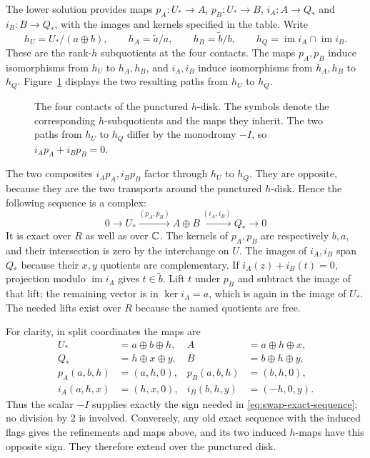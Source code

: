 The lower solution provides maps $p_A:U_*\to A$, $p_B:U_*\to B$,
$i_A:A\to Q_*$ and $i_B:B\to Q_*$, with the images and kernels
specified in the table.  Write
\[
 h_U=U_*/(a\oplus b),\qquad
 h_A=\widetilde a/a,\qquad h_B=\widetilde b/b,\qquad
 h_Q=\operatorname{im}i_A\cap\operatorname{im}i_B.
\]
These are the rank-$h$ subquotients at the four contacts.  The maps
$p_A,p_B$ induce isomorphisms from $h_U$ to $h_A,h_B$, and
$i_A,i_B$ induce isomorphisms from $h_A,h_B$ to $h_Q$.
Figure~\ref{fig:swap-disk} displays the two resulting paths from
$h_U$ to $h_Q$.

\begin{figure}[ht]
\centering

\caption{The four contacts of the punctured $h$-disk.
The symbols denote the corresponding $h$-subquotients and the
maps they inherit.  The two paths from $h_U$ to $h_Q$ differ by
the monodromy $-I$, so $i_Ap_A+i_Bp_B=0$.}
\label{fig:swap-disk}
\end{figure}

The two composites $i_Ap_A,i_Bp_B$ factor through $h_U$ to $h_Q$.
They are opposite, because they are the two transports around the
punctured $h$-disk.  Hence the following sequence is a complex:
\begin{equation}\label{eq:swap-exact-sequence}
 0\longrightarrow U_*
 \xrightarrow{(p_A,p_B)}A\oplus B
 \xrightarrow{(i_A,i_B)}Q_*\longrightarrow0
\end{equation}
It is exact over $R$ as well as over $\mathbb C$.  The kernels of $p_A,p_B$
are respectively $b,a$, and their intersection is zero by the
interchange on $U$.  The images of $i_A,i_B$ span $Q_*$ because
their $x,y$ quotients are complementary.  If
$i_A(z)+i_B(t)=0$, projection modulo $\operatorname{im}i_A$ gives
$t\in\widetilde b$.  Lift $t$ under $p_B$ and subtract the image
of that lift; the remaining vector is in $\ker i_A=a$, which is
again in the image of $U_*$.  The needed lifts exist over $R$
because the named quotients are free.

For clarity, in split coordinates the maps are
\begin{align*}
 U_*&=a\oplus b\oplus h,&A&=a\oplus h\oplus x,\\
 Q_*&=h\oplus x\oplus y,&B&=b\oplus h\oplus y,\\
 p_A(a,b,h)&=(a,h,0),&p_B(a,b,h)&=(b,h,0),\\
 i_A(a,h,x)&=(h,x,0),&i_B(b,h,y)&=(-h,0,y).
\end{align*}
Thus the scalar $-I$ supplies exactly the sign needed in
\eqref{eq:swap-exact-sequence}; no division by $2$ is involved.
Conversely, any old exact sequence with the induced flags gives
the refinements and maps above, and its two induced $h$-maps have
this opposite sign.  They therefore extend over the punctured disk.

